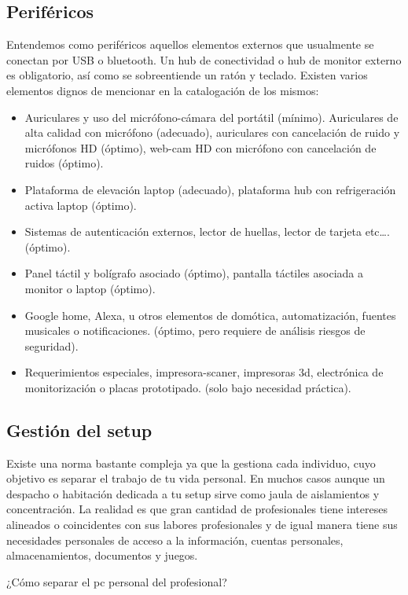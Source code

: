  \subsection{Periféricos}
 Entendemos como periféricos aquellos elementos externos que usualmente se conectan por USB o bluetooth. Un hub de conectividad o hub de monitor externo es obligatorio, así como se sobreentiende un ratón y teclado. Existen varios elementos dignos de mencionar en la catalogación de los mismos:
 \begin{itemize}
     \item Auriculares y uso del micrófono-cámara del portátil (mínimo). Auriculares de alta calidad con micrófono (adecuado), auriculares con cancelación de ruido y micrófonos HD (óptimo), web-cam HD con micrófono con cancelación de ruidos (óptimo).
     \item Plataforma de elevación laptop (adecuado), plataforma hub con refrigeración activa laptop (óptimo).
     \item Sistemas de autenticación externos, lector de huellas, lector de tarjeta etc…. (óptimo).
     \item Panel táctil y bolígrafo asociado (óptimo), pantalla táctiles asociada a monitor o laptop (óptimo).
     \item Google home, Alexa, u otros elementos de domótica, automatización, fuentes musicales o notificaciones. (óptimo, pero requiere de análisis riesgos de seguridad).

     \item Requerimientos especiales, impresora-scaner, impresoras 3d, electrónica de monitorización o placas prototipado. (solo bajo necesidad práctica).
 \end{itemize}

  \subsection{Gestión del setup}
  Existe una norma bastante compleja ya que la gestiona cada individuo, cuyo objetivo es separar el trabajo de tu vida personal. En muchos casos aunque un despacho o habitación dedicada a tu setup sirve como jaula de aislamientos y concentración. La realidad es que gran cantidad de profesionales tiene intereses alineados o coincidentes con sus labores profesionales y de igual manera tiene sus necesidades personales de acceso a la información, cuentas personales, almacenamientos, documentos y juegos.

¿Cómo separar el pc personal del profesional?

